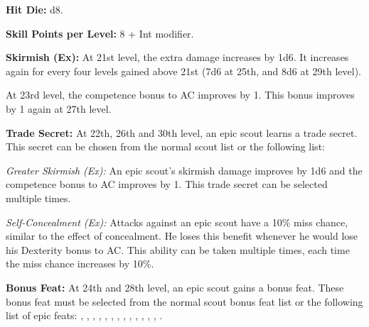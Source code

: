 

\textbf{Hit Die:} d8.

\textbf{Skill Points per Level:} 8 + Int modifier.

\textbf{Skirmish (Ex):} At 21st level, the extra damage increases by 1d6. It increases again for every four levels gained above 21st (7d6 at 25th, and 8d6 at 29th level).

At 23rd level, the competence bonus to AC improves by 1. This bonus improves by 1 again at 27th level.

\textbf{Trade Secret:} At 22th, 26th and 30th level, an epic scout learns a trade secret. This secret can be chosen from the normal scout list or the following list:

\textit{Greater Skirmish (Ex):} An epic scout's skirmish damage improves by 1d6 and the competence bonus to AC improves by 1. This trade secret can be selected multiple times.

\textit{Self-Concealment (Ex):} Attacks against an epic scout have a 10\% miss chance, similar to the effect of concealment. He loses this benefit whenever he would lose his Dexterity bonus to AC. This ability can be taken multiple times, each time the miss chance increases by 10\%.

\textbf{Bonus Feat:} At 24th and 28th level, an epic scout gains a bonus feat. These bonus feat must be selected from the normal scout bonus feat list or the following list of epic feats:
,
,
,
,
,
,
,
,
,
,
,
,
,
.

